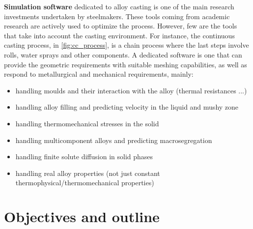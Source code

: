\textbf{Simulation software} dedicated to alloy casting is one of the main research investments undertaken by steelmakers. These tools coming from academic research
are actively used to optimize the process. However, few are the tools that take into account the casting environment. For instance, the continuous casting process, in
\cref{fig:cc_process}, is a chain process where the last steps involve rolls, water sprays and other components. A dedicated software is one that can provide the
geometric requirements with suitable meshing capabilities, as well as respond to metallurgical and mechanical requirements, mainly:
\begin{itemize}
\itemsep0em
\item handling moulds and their interaction with the alloy (thermal resistances ...)
\item handling alloy filling and predicting velocity in the liquid and mushy zone
\item handling thermomechanical stresses in the solid
\item handling multicomponent alloys and predicting macrosegregation
\item handling finite solute diffusion in solid phases
\item handling real alloy properties (not just constant thermophysical/thermomechanical properties)
\end{itemize}
\section{Objectives and outline}
